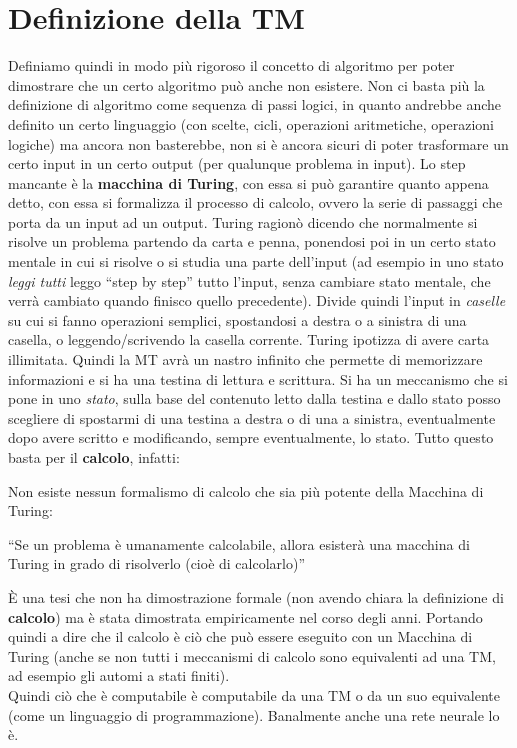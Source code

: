 \section{Definizione della TM}
Definiamo quindi in modo più rigoroso il concetto di algoritmo per poter
dimostrare che un certo algoritmo può anche non esistere. Non ci basta più la
definizione di algoritmo come sequenza di passi logici, in quanto andrebbe anche
definito un certo linguaggio (con scelte, cicli, operazioni aritmetiche,
operazioni logiche) ma ancora non basterebbe, non si è ancora sicuri di poter
trasformare un certo input in un certo output (per qualunque problema in
input). Lo step mancante è la \textbf{macchina di Turing}, con essa si può
garantire quanto appena detto, con essa si formalizza il processo di calcolo,
ovvero la serie di passaggi che porta da un input ad un output. Turing ragionò
dicendo che normalmente si risolve un problema partendo da carta e penna,
ponendosi poi in un certo stato mentale in cui si risolve o si studia una parte
dell'input (ad esempio in uno stato \textit{leggi tutti} leggo ``step by step''
tutto l'input, senza cambiare stato mentale, che verrà cambiato quando finisco
quello precedente). Divide quindi l'input in \textit{caselle} su cui si fanno
operazioni semplici, spostandosi a destra o a sinistra di una casella, o
leggendo/scrivendo la casella corrente. Turing ipotizza di avere carta
illimitata. Quindi la MT avrà un nastro infinito che permette di memorizzare
informazioni e si ha una testina di lettura e scrittura. Si ha un meccanismo che
si pone in uno \textit{stato}, sulla base del contenuto letto dalla testina e
dallo stato posso scegliere di spostarmi di una testina a destra o di una a
sinistra, eventualmente dopo avere scritto e modificando, sempre eventualmente,
lo stato. Tutto questo basta per il \textbf{calcolo}, infatti:
\begin{teorema}
  Non esiste nessun formalismo di calcolo che sia più
  potente della Macchina di Turing:
  \begin{center}
   ``Se un problema è umanamente calcolabile, allora esisterà una macchina di
    Turing in grado di risolverlo (cioè di calcolarlo)''
  \end{center}
  È una tesi che non ha dimostrazione formale (non avendo chiara la definizione
  di \textbf{calcolo}) ma è stata dimostrata
  empiricamente nel corso degli anni. Portando quindi a dire che il calcolo è
  ciò che può essere eseguito con un Macchina di Turing (anche se non tutti i
  meccanismi di calcolo sono equivalenti ad una TM, ad esempio gli automi a
  stati finiti).\\
  Quindi ciò che è computabile è computabile da una TM o da un suo equivalente
  (come un linguaggio di programmazione). Banalmente anche una rete neurale lo
  è. 
\end{teorema}
